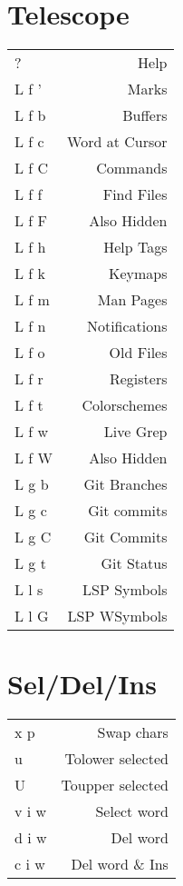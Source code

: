 \documentclass[
  ,landscape
  ,columns=4
]{cheatsheet}
\begin{document}
\section{Telescope}

\begin{tabular}{lr}
	?     & Help           \\
	L f ' & Marks          \\
	L f b & Buffers        \\
	L f c & Word at Cursor \\
	L f C & Commands       \\
	L f f & Find Files     \\
	L f F & Also Hidden    \\
	L f h & Help Tags      \\
	L f k & Keymaps        \\
	L f m & Man Pages      \\
	L f n & Notifications  \\
	L f o & Old Files      \\
	L f r & Registers      \\
	L f t & Colorschemes   \\
	L f w & Live Grep      \\
	L f W & Also Hidden    \\
	L g b & Git Branches   \\
	L g c & Git commits    \\
	L g C & Git Commits    \\
	L g t & Git Status     \\
	L l s & LSP Symbols    \\
	L l G & LSP WSymbols   \\
\end{tabular}

\section{Sel/Del/Ins}

\begin{tabular}{lr}
	x p   & Swap chars       \\
	u     & Tolower selected \\
	U     & Toupper selected \\
	v i w & Select word      \\
	d i w & Del word         \\
	c i w & Del word \& Ins  \\
\end{tabular}
\end{document}
